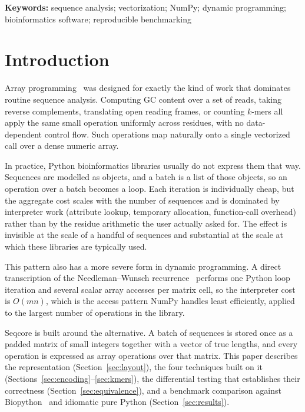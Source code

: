 \documentclass[10pt,letterpaper]{article}
\begin{document}
\vspace{0.2cm}
\noindent\textbf{Keywords:} sequence analysis; vectorization; NumPy; dynamic
programming; bioinformatics software; reproducible benchmarking

\section{Introduction}

Array programming~\cite{harris2020numpy} was designed for exactly the kind of
work that dominates routine sequence analysis. Computing GC content over a set of reads, taking
reverse complements, translating open reading frames, or counting $k$-mers all
apply the same small operation uniformly across residues, with no data-dependent
control flow. Such operations map naturally onto a single vectorized call over a
dense numeric array.

In practice, Python bioinformatics libraries usually do not express them that
way. Sequences are modelled as objects, and a batch is a list of those objects,
so an operation over a batch becomes a loop. Each iteration is individually
cheap, but the aggregate cost scales with the number of sequences and is
dominated by interpreter work (attribute lookup, temporary allocation,
function-call overhead) rather than by the residue arithmetic the user actually
asked for. The effect is invisible at the scale of a handful of
sequences and substantial at the scale at which these libraries are typically
used.

This pattern also has a more severe form in dynamic programming. A direct
transcription of the Needleman--Wunsch recurrence~\cite{needleman1970} performs
one Python loop iteration and several scalar array accesses per matrix cell, so
the interpreter cost is $O(mn)$, which is the access pattern NumPy handles
least efficiently, applied to the largest number of operations in the library.

Seqcore is built around the alternative. A batch of sequences is stored once as
a padded matrix of small integers together with a vector of true lengths, and
every operation is expressed as array operations over that matrix. This paper
describes the representation (Section~\ref{sec:layout}), the four techniques
built on it (Sections~\ref{sec:encoding}--\ref{sec:kmers}), the differential
testing that establishes their correctness (Section~\ref{sec:equivalence}), and
a benchmark comparison against Biopython~\cite{cock2009biopython} and idiomatic
pure Python (Section~\ref{sec:results}).
\end{document}
